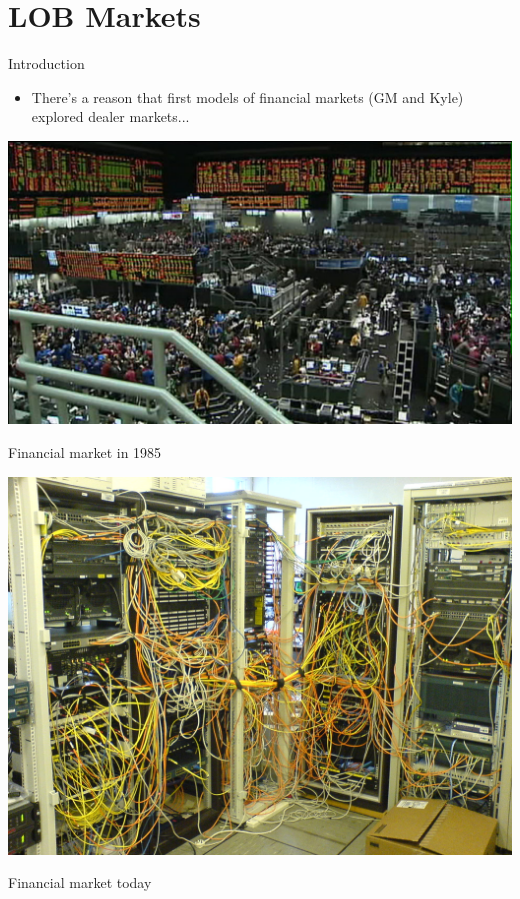\documentclass[english,10pt
,aspectratio=169
]{beamer}
\begin{document}
\section{LOB Markets}

\begin{frame}{Introduction}
	\begin{itemize}
		\item There's a reason that first models of financial markets (GM and Kyle) explored dealer markets...
	\end{itemize}
\end{frame}


\begin{frame}
	\centering
	\includegraphics[scale=0.5]{pics/mkt20}
	
	Financial market in 1985
\end{frame}


\begin{frame}
	\centering
	\includegraphics[scale=0.19]{pics/mkt21}
	
	Financial market today
\end{frame}
\end{document}
